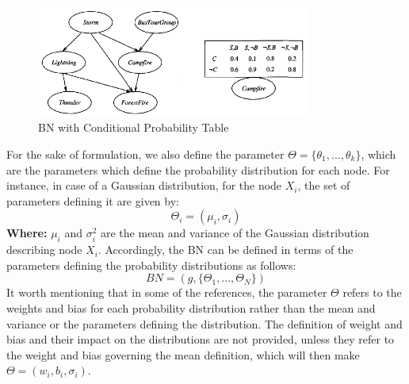\documentclass{article}
\begin{document}
\begin{figure}[H]
	\centering
	\includegraphics[width=0.8\textwidth]{cond_prob.png}
	\caption{BN with Conditional Probability Table}
\end{figure}
For the sake of formulation, we also define the parameter $\Theta = \{\theta_1, ..., \theta_k\}$, which are the parameters which define the probability distribution for each node. For instance, in case of a Gaussian distribution, for the node $X_i$, the set of parameters defining it are given by: 
\begin{equation}
\Theta_i = (\mu_i, \sigma_i)
\end{equation}
\textbf{Where:} $\mu_i$ and $\sigma_i^2$ are the mean and variance of the Gaussian distribution describing node $X_i$. Accordingly, the BN can be defined in terms of the parameters defining the probability distributions as follows:
\begin{equation}
BN = (g, \{ \Theta_1,..., \Theta_N  \})
\end{equation}
It worth mentioning that in some of the references, the parameter $\Theta$ refers to the weights and bias for each probability distribution rather than the mean and variance or the parameters defining the distribution. The definition of weight and bias and their impact on the distributions are not provided, unless they refer to the weight and bias governing the mean definition, which will then make $\Theta=(w_i, b_i, \sigma_i)$. 
\end{document}
